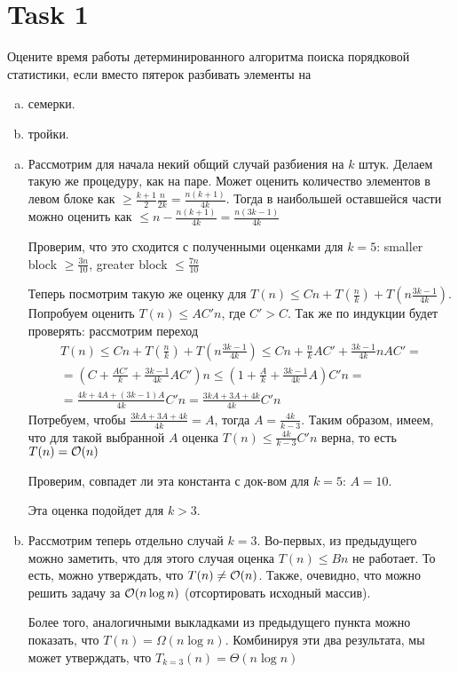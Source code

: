 \section{Task 1}
\begin{task}
    Оцените время работы детерминированного алгоритма поиска порядковой статистики, если вместо пятерок разбивать элементы на
    \begin{enumerate}[(a)]
        \item семерки.
        \item тройки.
    \end{enumerate}
\end{task}

\begin{solution}
    \begin{enumerate}[(a)]
        \item 
        Рассмотрим для начала некий общий случай разбиения на $k$ штук. Делаем такую же процедуру, как на паре.
        Может оценить количество элементов в левом блоке как $\geq \frac{k+1}{2}\frac{n}{2k}=\frac{n(k+1)}{4k}$.
        Тогда в наибольшей оставшейся части можно оценить как $\leq n - \frac{n(k+1)}{4k} = \frac{n(3k-1)}{4k}$
        \begin{remark}
            Проверим, что это сходится с полученными оценками для $k=5$: smaller block $\geq \frac{3n}{10}$, greater block $\leq \frac{7n}{10}$
        \end{remark}
        Теперь посмотрим такую же оценку для $T(n) \leq Cn + T\left(\frac{n}{k}\right) + T\left(n\frac{3k-1}{4k}\right)$. Попробуем оценить $T(n) \leq AC'n$, где $C'>C$.
        Так же по индукции будет проверять: рассмотрим переход
        \begin{gather}
            T(n) \leq Cn + T\left(\frac{n}{k}\right) + T\left(n\frac{3k-1}{4k}\right) \leq Cn + \frac{n}{k}AC' + \frac{3k-1}{4k}nAC' = \\
            = \left(C + \frac{AC'}{k} + \frac{3k-1}{4k}AC'\right)n \leq \left(1 + \frac{A}{k} + \frac{3k-1}{4k}A\right)C'n = \\
            = \frac{4k + 4A + (3k - 1)A}{4k}C'n = \frac{3kA + 3A + 4k}{4k}C'n
        \end{gather}
        Потребуем, чтобы $\frac{3kA + 3A + 4k}{4k} = A$, тогда $A = \frac{4k}{k-3}$.
        Таким образом, имеем, что для такой выбранной $A$ оценка $T(n) \leq \frac{4k}{k-3}C'n$ верна, то есть $T(n) = \mathcal{O}(n)$
        \begin{remark}
            Проверим, совпадет ли эта константа с док-вом для $k=5$: $A=10$.
        \end{remark}
        Эта оценка подойдет для $k > 3$.
        \item
        Рассмотрим теперь отдельно случай $k=3$. Во-первых, из предыдущего можно заметить, что для этого случая оценка $T(n) \leq Bn$ не работает. То есть, можно утверждать, что $T(n) \neq \mathcal{O}(n)$. Также, очевидно, что можно решить задачу за $\mathcal{O}(n\log n)$ (отсортировать исходный массив).

        Более того, аналогичными выкладками из предыдущего пункта можно показать, что $T(n) = \Omega(n\log n)$. Комбинируя эти два результата, мы может утверждать, что $T_{k=3}(n) = \Theta(n\log n)$
    \end{enumerate}
\end{solution}